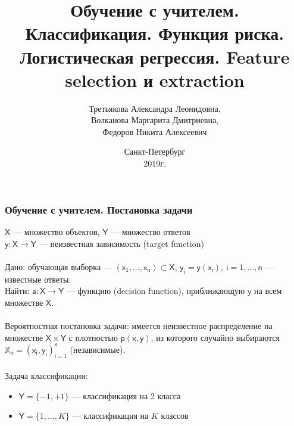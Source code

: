 \documentclass[unicode, notheorems]{beamer}
\title[Обучение с учителем. Классификация]{Обучение с учителем. Классификация. Функция риска. Логистическая регрессия. Feature selection и extraction}
\author[А.Третьякова, М.Волканова, Н.Федоров]{Третьякова Александра Леонидовна, \\ Волканова Маргарита Дмитриевна, \\
	 Федоров Никита Алексеевич}
\date{
    Санкт-Петербург\\
    2019г.
}
\begin{document}
\begin{frame}
    \titlepage
\end{frame}


\begin{frame}
    \frametitle{Обучение с учителем. Постановка задачи}
 $\mathsf{X}$ --- множество объектов, $\mathsf{Y}$ --- множество ответов \\
 $\mathsf{y}: \mathsf{X}\to \mathsf{Y}$ --- неизвестная зависимость (target function) \\
 ~\\
 Дано: обучающая выборка --- $\mathsf{(x_1,\ldots, x_n) \subset X}$, $\mathsf{y_i=y(x_i), ~i=1,\ldots,n}$ --- известные ответы. \\
 Найти: $\mathsf{a:X\to Y}$ --- функцию (decision function), приближающую $\mathsf{y}$ на всем множестве $\mathsf{X}$. \\
   ~\\
 Вероятностная постановка задачи: имеется неизвестное распределение на множестве $\mathsf{X\times Y}$ с плотностью $\mathsf{p(x,y)}$, из которого случайно выбираются $\mathbb{X}_\mathsf{n}=\mathsf{(x_i,y_i)_{i=1}^n}$ (независимые). \\
  ~\\
 Задача классификации: 
 \begin{itemize}
 	\item $\mathsf{Y}=\{-1,+1\}$ --- классификация на 2 класса
 	\item $\mathsf{Y}=\{1,\ldots,K\}$ --- классификация на $K$ классов
 \end{itemize}
\end{frame}
\end{document}
